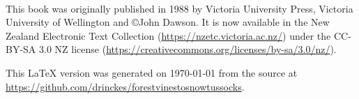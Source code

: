 \thispagestyle{empty}

~\vfill

This book was originally published in 1988 by Victoria University Press, Victoria University of Wellington and ©John Dawson.
It is now available in the New Zealand Electronic Text Collection (\url{https://nzetc.victoria.ac.nz/}) under the CC-BY-SA 3.0 NZ license (\url{https://creativecommons.org/licenses/by-sa/3.0/nz/}).

This \LaTeX{} version was generated on \today{} from the source at \url{https://github.com/drinckes/forestvinestosnowtussocks}.

